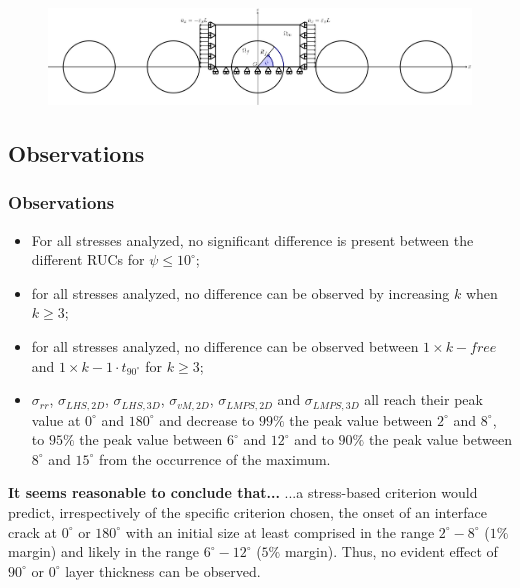 \documentclass[first,firstsupp,lastsupp,last,hyperref,table]{ETHclass}
\begin{document}
\begin{frame}
\begin{columns}[c]
\begin{column}{0.5\textwidth}
\begin{figure}
\end{figure}
\end{column}
\end{columns}
\vspace{-0.4cm}
\centering
\begin{figure}
\centering
\includegraphics[width=\textwidth]{refAngle.pdf}
\end{figure}
\end{frame}

\subsection{Observations}

\begin{frame}
\frametitle{Observations}
\vspace{-0.5cm}
\centering
\scriptsize
\begin{itemize}[label=]
\item For all stresses analyzed, no significant difference is present between the different RUCs for $\psi\leq10^{\circ}$;
\item for all stresses analyzed, no difference can be observed by increasing $k$ when $k\geq3$;
\item for all stresses analyzed, no difference can be observed between $1\times  k-free$ and $1\times  k-1\cdot t_{90^{\circ}}$ for $k\geq3$;
\item $\sigma_{rr}$, $\sigma_{LHS,2D}$, $\sigma_{LHS,3D}$, $\sigma_{vM,2D}$, $\sigma_{LMPS,2D}$ and $\sigma_{LMPS,3D}$ all reach their peak value at $0^{\circ}$ and $180^{\circ}$ and decrease to $99\%$ the peak value between $2^{\circ}$ and $8^{\circ}$, to $95\%$ the peak value between $6^{\circ}$ and $12^{\circ}$ and to $90\%$ the peak value between $8^{\circ}$ and $15^{\circ}$ from the occurrence of the maximum.
\end{itemize}
\begin{alertblock}{\centering\scriptsize\bf It seems reasonable to conclude that...}
...a stress-based criterion would predict, irrespectively of the specific criterion chosen, the onset of an interface crack at $0^{\circ}$ or $180^{\circ}$ with an initial size at least comprised in the range $2^{\circ}-8^{\circ}$ ($1\%$ margin) and likely in the range $6^{\circ}-12^{\circ}$ ($5\%$ margin). Thus, no evident effect of $90^{\circ}$ or $0^{\circ}$ layer thickness can be observed.
\end{alertblock}
\end{frame}
\end{document}

